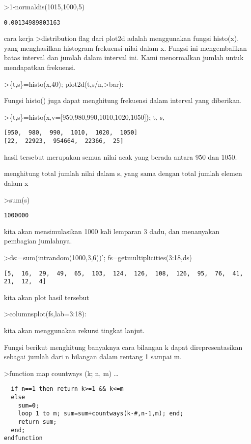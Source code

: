 \documentclass[
]{book}
\begin{document}
\textgreater1-normaldis(1015,1000,5)

\begin{verbatim}
0.00134989803163
\end{verbatim}

cara kerja \textgreater distribution flag dari plot2d adalah menggunakan fungsi histo(x), yang menghasilkan histogram frekuensi nilai dalam x. Fungsi ini mengembalikan batas interval dan jumlah dalam interval ini. Kami menormalkan jumlah untuk mendapatkan frekuensi.

\textgreater\{t,s\}=histo(x,40); plot2d(t,s/n,\textgreater bar):

Fungsi histo() juga dapat menghitung frekuensi dalam interval yang diberikan.

\textgreater\{t,s\}=histo(x,v={[}950,980,990,1010,1020,1050{]}); t, s,

\begin{verbatim}
[950,  980,  990,  1010,  1020,  1050]
[22,  22923,  954664,  22366,  25]
\end{verbatim}

hasil tersebut merupakan semua nilai acak yang berada antara 950 dan 1050.

menghitung total jumlah nilai dalam s, yang sama dengan total jumlah elemen dalam x

\textgreater sum(s)

\begin{verbatim}
1000000
\end{verbatim}

kita akan mensimulasikan 1000 kali lemparan 3 dadu, dan menanyakan pembagian jumlahnya.

\textgreater ds:=sum(intrandom(1000,3,6))'; fs=getmultiplicities(3:18,ds)

\begin{verbatim}
[5,  16,  29,  49,  65,  103,  124,  126,  108,  126,  95,  76,  41,
21,  12,  4]
\end{verbatim}

kita akan plot hasil tersebut

\textgreater columnsplot(fs,lab=3:18):

kita akan menggunakan rekursi tingkat lanjut.

Fungsi berikut menghitung banyaknya cara bilangan k dapat direpresentasikan sebagai jumlah dari n bilangan dalam rentang 1 sampai m.

\textgreater function map countways (k; n, m) \ldots{}

\begin{verbatim}
  if n==1 then return k>=1 && k<=m
  else
    sum=0; 
    loop 1 to m; sum=sum+countways(k-#,n-1,m); end;
    return sum;
  end;
endfunction
\end{verbatim}
\end{document}
